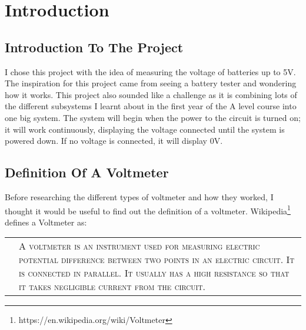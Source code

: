 \chapter{Introduction}
\section{Introduction To The Project}
I chose this project with the idea of measuring the voltage of batteries up to 5V. The inspiration for this project came from seeing a battery tester and wondering how it works. This project also sounded like a challenge as it is combining lots of the different subsystems I learnt about in the first year of the A level course into one big system.
The system will begin when the power to the circuit is turned on; it will work continuously, displaying the voltage connected until the system is powered down. If no voltage is connected, it will display 0V.
\section{Definition Of A Voltmeter}
Before researching the different types of voltmeter and how they worked, I thought it would be useful to find out the definition of a voltmeter. Wikipedia\footnote{https://en.wikipedia.org/wiki/Voltmeter} defines a Voltmeter as:
\begin{table}[H]
    \begin{tabularx}{0.9\textwidth} { c | X }
         &  \textsc{A voltmeter is an instrument used for measuring electric potential difference between two points in an electric circuit. It is connected in parallel. It usually has a high resistance so that it takes negligible current from the circuit.}
    \end{tabularx}
\end{table}
